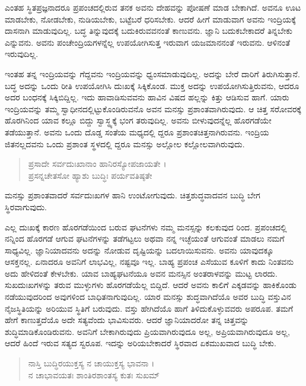 ಎಂತಹ ಸ್ಥಿತಪ್ರಜ್ಞನಾದರೂ ಪ್ರಪಂಚದಲ್ಲಿರುವ ತನಕ ಅವನು ದೇಹವನ್ನು ಪೋಷಣೆ ಮಾಡ ಬೇಕಾಗಿದೆ. ಅವನೂ ಊಟ ಮಾಡಬೇಕು, ನೋಡಬೇಕು, ನುಡಿಯಬೇಕು, ಬಟ್ಟೆಬರೆ ಧರಿಸಬೇಕು. ಆದರೆ ಹೀಗೆ ಮಾಡುವಾಗ ಅವನು ಇಂದ್ರಿಯಕ್ಕೆ ದಾಸನಾಗಿ ಮಾಡುವುದಿಲ್ಲ. ಬದ್ಧ ತಿನ್ನುವುದಕ್ಕೆ ಬದುಕಿರುವವನಂತೆ ಕಾಣುವನು. ಜ್ಞಾನಿ ಬದುಕಬೇಕಾದರೆ ತಿನ್ನಬೇಕು ಎನ್ನುವನು. ಅವನು ಪಂಚೇಂದ್ರಿಯಗಳನ್ನೆಲ್ಲ ಉಪಯೋಗಿಸುತ್ತ ಇರುವಾಗ ಯಜಮಾನನಂತೆ ಇರುವನು. ಆಳಿನಂತೆ ಇರುವುದಿಲ್ಲ.

ಇಂತಹ ತನ್ನ ಇಂದ್ರಿಯವನ್ನು ಗೆದ್ದವನು ಇಂದ್ರಿಯವನ್ನು ಧ್ವಂಸಮಾಡುವುದಿಲ್ಲ. ಅದನ್ನು ಬೇರೆ ದಾರಿಗೆ ತಿರುಗಿಸುತ್ತಾನೆ. ಬದ್ಧ ಅದನ್ನು ಒಂದು ರೀತಿ ಉಪಯೋಗಿಸಿ ದುಃಖಕ್ಕೆ ಸಿಕ್ಕಿಕೊಂಡ. ಮುಕ್ತ ಅದನ್ನು ಉಪಯೋಗಿಸುತ್ತಿರುವನು, ಆದರೂ ಅದರ ಬಂಧನಕ್ಕೆ ಸಿಕ್ಕಿಬಿದ್ದಿಲ್ಲ. ಇದು ಹಾವಾಡಿಸುವವನು ಹಾವಿನ ವಿಷದ ಹಲ್ಲನ್ನು ಕಿತ್ತು ಆಡಿಸುವ ಹಾಗೆ. ಯಾರು ಇಂದ್ರಿಯವನ್ನು ತಮ್ಮ ಸ್ವಾಧೀನದಲ್ಲಿಟ್ಟುಕೊಂಡಿರುವನೊ ಅವನ ಮನಸ್ಸು ಪ್ರಶಾಂತವಾಗಿರುವುದು. ಆ ಚಿತ್ತ ಸರೋವರಕ್ಕೆ ಹೊರಗಿನಿಂದ ಯಾವ ಕಲ್ಲೂ ಬಿದ್ದು ಸ್ವಾಸ್ಥ್ಯಕ್ಕೆ ಭಂಗ ತರುವುದಿಲ್ಲ. ಅವನು ಬೀಳುವುದನ್ನೆಲ್ಲ ಹೊರಗಡೆಯೇ ತಡೆಯುತ್ತಾನೆ. ಅವನು ಒಂದು ದೊಡ್ಡ ಸಂತೆಯ ಮಧ್ಯದಲ್ಲಿ ದ್ದರೂ ಪ್ರಶಾಂತಚಿತ್ತನಾಗಿರುವನು. ಇಂದ್ರಿಯ ಜಿತನಲ್ಲದವನು ಒಂದು ಪ್ರಶಾಂತ ಸ್ಥಳದಲ್ಲಿ ದ್ದರೂ ಮನಸ್ಸು ಅಲ್ಲೋಲ ಕಲ್ಲೋಲವಾಗಿರುವುದು.

\begin{verse}
ಪ್ರಸಾದೇ ಸರ್ವದುಃಖಾನಾಂ ಹಾನಿರಸ್ಯೋಪಜಾಯತೇ ।\\ಪ್ರಸನ್ನಚೇತಸೋ ಹ್ಯಾಶು ಬುದ್ಧಿಃ ಪರ್ಯವತಿಷ್ಠತೇ 
\end{verse}

{\small ಮನಸ್ಸು ಪ್ರಶಾಂತವಾದರೆ ಸರ್ವದುಃಖಗಳ ಹಾನಿ ಉಂಟೋಗುವುದು. ಚಿತ್ತಶುದ್ಧವಾದವನ ಬುದ್ಧಿ ಬೇಗ ಸ್ಥಿರವಾಗುವುದು.}

ಎಲ್ಲ ದುಃಖಕ್ಕೆ ಕಾರಣ ಹೊರಗಡೆಯಿಂದ ಬರುವ ಘಟನೆಗಳು ನಮ್ಮ ಮನಸ್ಸನ್ನು ಕಲಕುವುದ ರಿಂದ. ಪ್ರಪಂಚದಲ್ಲಿ ನನ್ನಿಂದ ಹೊರಗಡೆ ಆಗುವ ಘಟನೆಗಳನ್ನು ತಡೆಗಟ್ಟಲು ಅಥವಾ ನನ್ನ ಇಚ್ಛೆಯಂತೆ ಆಗುವಂತೆ ಮಾಡಲು ನಮಗೆ ಸಾಧ್ಯವಿಲ್ಲ. ಜ್ಞಾನಿಯಾದವನು ಅದನ್ನು ನೋಡುವ ದೃಷ್ಟಿಯನ್ನು ಬದಲಾಯಿಸುವನು. ಅವನು ಯಾವುದಕ್ಕೂ ಆಸಕ್ತನಲ್ಲ. ಏನಾದರೂ ಅವನಿಗೆ ಲಾಭವಿಲ್ಲ, ನಷ್ಟವೂ ಇಲ್ಲ. ಬಾಹ್ಯ ಪ್ರಪಂಚ ಎಸೆಯುವ ಕೂಳಿಗೆ ಕಾದು ನಿಂತವನು ಅದು ಹೇಳಿದಂತೆ ಕೇಳಬೇಕು. ಯಾವ ಬಾಹ್ಯಘಟನೆಯೂ ಅವನ ಮನಸ್ಸಿನ ಅಂತರಾಳವನ್ನು ಮುಟ್ಟ ಲಾರದು. ಸುಖದುಃಖಗಳನ್ನು ತರುವ ಮುಳ್ಳುಗಳು ಹೊರಗಡೆಯೆಲ್ಲ ಬಿದ್ದಿದೆ. ಆದರೆ ಅವನು ಕಾಲಿಗೆ ಎಕ್ಕಡವನ್ನು ಹಾಕಿಕೊಂಡು ನಡೆಯುವುದರಿಂದ ಅವುಗಳಿಂದ ಬಾಧಿತನಾಗುವುದಿಲ್ಲ. ಯಾರ ಮನಸ್ಸು ಶುದ್ಧವಾಗಿದೆಯೊ ಅವರ ಬುದ್ಧಿ ವಸ್ತುವಿನ ನೈಜಸ್ಥಿತಿಯನ್ನು ಅರಿಯುವ ಸ್ಥಿತಿಗೆ ಬರುವುದು. ವಸ್ತು ಹೇಗಿದೆಯೊ ಹಾಗೆ ತಿಳಿದುಕೊಳ್ಳುವವರು ಅಪರೂಪ. ತಮಗೆ ಹೇಗೆ ಕಾಣುತ್ತದೆಯೊ ಅದೇ ಸತ್ಯವೆಂದು ಭಾವಿಸುವರು. ಆದರೆ ಜ್ಞಾನಿಯಾದರೋ ತನ್ನ ಚಿತ್ತವನ್ನು ಶುದ್ಧಿಮಾಡಿಕೊಂಡಿರುವನು. ಅವನಿಗೆ ಬೇಕಾಗಿರುವುದು ಪ್ರಿಯವಾಗಿರುವುದೂ ಅಲ್ಲ, ಅಪ್ರಿಯವಾಗಿರುವುದೂ ಅಲ್ಲ, ಆದರೆ ಹಿಂದೆ ಇರುವ ಸತ್ಯದ ಸ್ವರೂಪ. ಇದನ್ನು ಅರಿಯಬೇಕಾದರೆ ಸ್ಥಿರವಾದ ಏಕಮುಖವಾದ ಬುದ್ಧಿ ಬೇಕು.

\begin{verse}
ನಾಸ್ತಿ ಬುದ್ಧಿರಯುಕ್ತಸ್ಯ ನ ಚಾಯುಕ್ತಸ್ಯ ಭಾವನಾ ।\\ನ ಚಾಭಾವಯತಃ ಶಾಂತಿರಶಾಂತಸ್ಯ ಕುತಃ ಸುಖಮ್ 
\end{verse}

